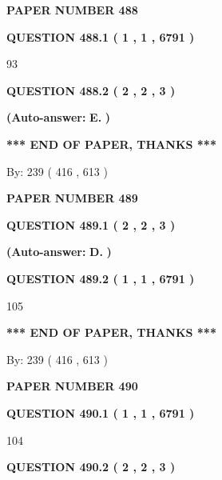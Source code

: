 \documentclass{ctexart}
\begin{document}
   
\newpage 
\setcounter{page}{ 
   488001 } 
   
   
 {\textbf{ \Large{ PAPER NUMBER  488  }}}
   
   
   
   
  
  
{\textbf{\large{QUESTION
488.1 
 ( 1 , 1 , 6791 )
}}}

93
  
  
{\textbf{\large{QUESTION
488.2 
 ( 2 , 2 , 3 )
}}}
 
 
{\textbf{(Auto-answer:}}
{\textbf{\large{
E.}}}
{\textbf{)}}
 
 
   
   
   
   
\vspace{1.0in} 
{\textbf{\large{ *** END OF PAPER, THANKS *** }}} 
   
   
\hspace{1.0in} By: 
 239 ( 416 ,  613 )
   
   
   
   
\newpage 
\setcounter{page}{ 
   489001 } 
   
   
 {\textbf{ \Large{ PAPER NUMBER  489  }}}
   
   
   
   
  
  
{\textbf{\large{QUESTION
489.1 
 ( 2 , 2 , 3 )
}}}
 
 
{\textbf{(Auto-answer:}}
{\textbf{\large{
D.}}}
{\textbf{)}}
 
 
  
  
{\textbf{\large{QUESTION
489.2 
 ( 1 , 1 , 6791 )
}}}

105
   
   
   
   
\vspace{1.0in} 
{\textbf{\large{ *** END OF PAPER, THANKS *** }}} 
   
   
\hspace{1.0in} By: 
 239 ( 416 ,  613 )
   
   
   
   
\newpage 
\setcounter{page}{ 
   490001 } 
   
   
 {\textbf{ \Large{ PAPER NUMBER  490  }}}
   
   
   
   
  
  
{\textbf{\large{QUESTION
490.1 
 ( 1 , 1 , 6791 )
}}}

104
  
  
{\textbf{\large{QUESTION
490.2 
 ( 2 , 2 , 3 )
}}}
 
\end{document}
